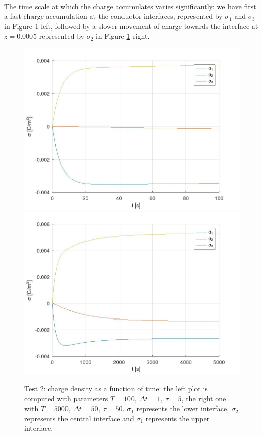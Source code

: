 \documentclass{Configuration_Files/PoliMi3i_thesis}
\begin{document}
\\The time scale at which the charge accumulates varies significantly: we have first a fast charge accumulation at the conductor interfaces, represented by $\sigma_1$ and $\sigma_3$ in Figure \ref{fig: 2.3} left, followed by a slower movement of charge towards the interface at $z=0.0005$ represented by $\sigma_2$ in Figure \ref{fig: 2.3} right.
\begin{figure}[h!]
    \centering
   \includegraphics[scale=0.2]{Images/2.rho_time_fast.jpeg}
   \includegraphics[scale=0.2]{Images/2.rho_time.jpeg}
    \caption {Test 2: charge density as a function of time: the left plot is computed with parameters $T=100,\ \Delta t=1,\ \tau=5$, the right one with $T=5000,\ \Delta t=50,\ \tau=50$. $\sigma_1$ represents the lower interface, $\sigma_2$ represents the central interface and $\sigma_1$ represents the upper interface.}
    \label{fig: 2.3}
\end{figure}
\end{document}
